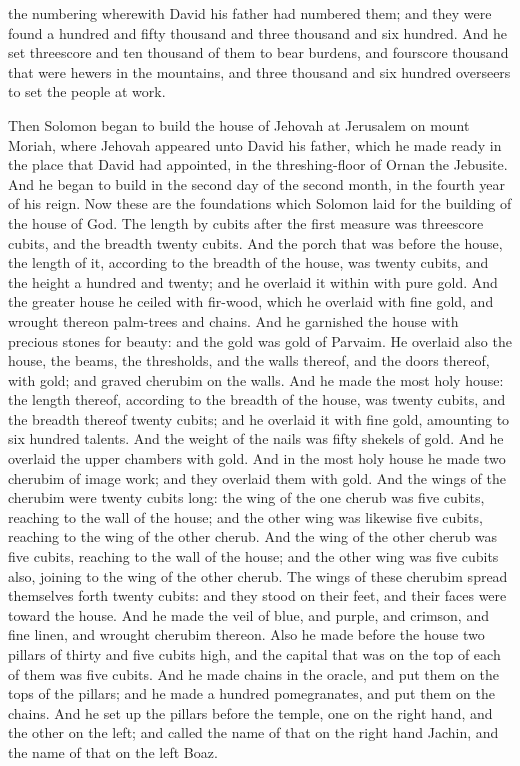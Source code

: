 the numbering wherewith David his father had numbered them; and they were found a hundred and fifty thousand and three thousand and six hundred. And he set threescore and ten thousand of them to bear burdens, and fourscore thousand that were hewers in the mountains, and three thousand and six hundred overseers to set the people at work. 

Then Solomon began to build the house of Jehovah at Jerusalem on mount Moriah, where Jehovah appeared unto David his father, which he made ready in the place that David had appointed, in the threshing-floor of Ornan the Jebusite. And he began to build in the second day of the second month, in the fourth year of his reign. Now these are the foundations which Solomon laid for the building of the house of God. The length by cubits after the first measure was threescore cubits, and the breadth twenty cubits. And the porch that was before the house, the length of it, according to the breadth of the house, was twenty cubits, and the height a hundred and twenty; and he overlaid it within with pure gold. And the greater house he ceiled with fir-wood, which he overlaid with fine gold, and wrought thereon palm-trees and chains. And he garnished the house with precious stones for beauty: and the gold was gold of Parvaim. He overlaid also the house, the beams, the thresholds, and the walls thereof, and the doors thereof, with gold; and graved cherubim on the walls.  And he made the most holy house: the length thereof, according to the breadth of the house, was twenty cubits, and the breadth thereof twenty cubits; and he overlaid it with fine gold, amounting to six hundred talents. And the weight of the nails was fifty shekels of gold. And he overlaid the upper chambers with gold.  And in the most holy house he made two cherubim of image work; and they overlaid them with gold. And the wings of the cherubim were twenty cubits long: the wing of the one cherub was five cubits, reaching to the wall of the house; and the other wing was likewise five cubits, reaching to the wing of the other cherub. And the wing of the other cherub was five cubits, reaching to the wall of the house; and the other wing was five cubits also, joining to the wing of the other cherub. The wings of these cherubim spread themselves forth twenty cubits: and they stood on their feet, and their faces were toward the house. And he made the veil of blue, and purple, and crimson, and fine linen, and wrought cherubim thereon.  Also he made before the house two pillars of thirty and five cubits high, and the capital that was on the top of each of them was five cubits. And he made chains in the oracle, and put them on the tops of the pillars; and he made a hundred pomegranates, and put them on the chains. And he set up the pillars before the temple, one on the right hand, and the other on the left; and called the name of that on the right hand Jachin, and the name of that on the left Boaz. 

